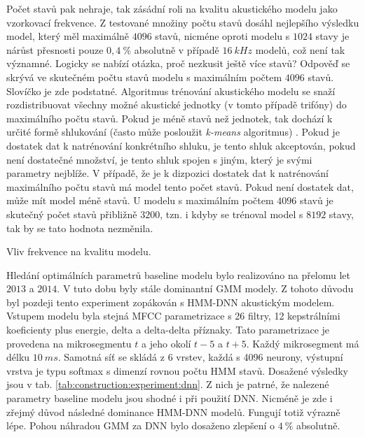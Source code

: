 Počet stavů pak nehraje, tak zásádní roli na kvalitu akustického modelu jako vzorkovací frekvence. Z testované množiny počtu stavů dosáhl nejlepšího výsledku model, který měl maximálně $4096$ stavů, nicméne oproti modelu s $1024$ stavy je nárůst přesnosti pouze $0,4\ \%$ absolutně v případě $16\ kHz$ modelů, což není tak významné. Logicky se nabízí otázka, proč nezkusit ještě více stavů? Odpověď se skrývá ve skutečném počtu stavů modelu s maximálním počtem $4096$ stavů. Slovíčko  je zde podstatné. Algoritmus trénování akustického modelu se snaží rozdistribuovat všechny možné akustické jednotky (v tomto případě trifóny) do maximálního počtu stavů. Pokud je méně stavů než jednotek, tak dochází k určité formě shlukování (často může posloužit \textit{k-means} algoritmus) \cite{Holmes2001}. Pokud je dostatek dat k natrénování konkrétního shluku, je tento shluk akceptován, pokud není dostatečné množství, je tento shluk spojen s jiným, který je svými parametry nejblíže. V případě, že je k dizpozici dostatek dat k natrénování maximálního počtu stavů má model tento počet stavů. Pokud není dostatek dat, může mít model méně stavů. U modelu s maximálním počtem $4096$ stavů je skutečný počet stavů přibližně $3200$, tzn. i kdyby se trénoval model s $8192$ stavy, tak by se tato hodnota nezměnila.


\begin{table}[htpb]
  \centering
  \def\arraystretch{1.5}
  \caption{Vliv frekvence na kvalitu modelu.}
  \label{tab:construction:experiment:gmm}
\end{table}

Hledání optimálních parametrů baseline modelu bylo realizováno na přelomu let $2013$ a $2014$. V tuto dobu byly stále dominantní GMM modely. Z tohoto důvodu byl pozdeji tento experiment zopákován s HMM-DNN akustickým modelem. Vstupem modelu byla stejná MFCC parametrizace s 26 filtry, 12 kepstrálními koeficienty plus energie, delta a delta-delta příznaky. Tato parametrizace je provedena na mikrosegmentu $t$ a jeho okolí $t-5$ a $t+5$. Každý mikrosegment má délku $10\ ms$. Samotná síť se skládá z 6 vrstev, každá s 4096 neurony, výstupní vrstva je typu softmax s dimenzí rovnou počtu HMM stavů. Dosažené výsledky jsou v tab. \ref{tab:construction:experiment:dnn}. Z nich je patrné, že nalezené parametry baseline modelu jsou shodné i při použití DNN. Nicméně je zde i zřejmý důvod následné dominance HMM-DNN modelů. Fungují totiž výrazně lépe. Pohou náhradou GMM za DNN bylo dosaženo zlepšení o $4\ \%$ absolutně.

